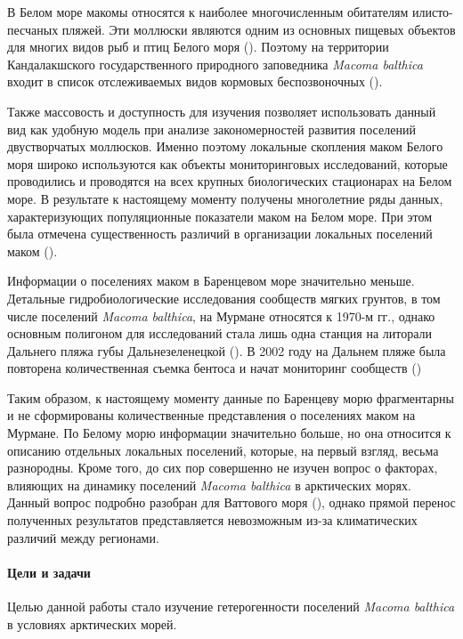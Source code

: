 В Белом море макомы относятся к наиболее многочисленным обитателям илисто-песчаных пляжей. 
Эти моллюски являются одним из основных пищевых объектов для многих видов рыб и птиц Белого моря (\cite{Azarov_1963, Percov_1963, Golcev_et_al_1997, Bianki_et_al_2003}). 
Поэтому на территории Кандалакшского государственного природного заповедника {\it Macoma balthica} входит в список отслеживаемых видов кормовых беспозвоночных (\cite{Nazarova_2003}).

Также массовость и доступность для изучения позволяет использовать данный вид как удобную модель при анализе закономерностей развития поселений двустворчатых моллюсков. 
Именно поэтому локальные скопления маком Белого моря широко используются как объекты мониторинговых исследований, которые проводились и проводятся на всех крупных биологических стационарах на Белом море. 
В результате к настоящему моменту получены многолетние ряды данных, характеризующих  популяционные показатели маком на Белом море. 
При этом была отмечена существенность различий в организации локальных поселений маком (\cite{Semenova_1974, Maximovich_Kunina_1982, Maximovich_et_al_1991, Poloskin_1996, Nikolaeva_1998, Nazarova_2003, Nazarova_Poloskin_2005}).
 
Информации о поселениях маком в Баренцевом море значительно меньше. 
Детальные гидробиологические исследования сообществ мягких грунтов, в том числе  поселений {\it Macoma balthica}, на Мурмане относятся к 1970-м гг., однако основным полигоном для исследований стала лишь одна станция на литорали Дальнего пляжа губы Дальнезеленецкой (\cite{Agarova_et_al_1976}).
В 2002 году на Дальнем пляже была повторена количественная съемка бентоса и начат мониторинг сообществ (\cite{Genelt_Dalnezeleneckaya_2008})

Таким образом, к настоящему моменту данные по Баренцеву морю фрагментарны и не сформированы количественные представления о поселениях маком на Мурмане. 
По Белому морю информации значительно больше, но она относится к описанию отдельных локальных поселений, которые, на первый взгляд, весьма разнородны. 
Кроме того, до сих пор совершенно не изучен вопрос о факторах, влияющих на динамику поселений {\it Macoma balthica} в арктических морях. 
Данный вопрос подробно разобран для Ваттового моря (\cite{Hiddink_et_al_2002_predation_epifauna, Hiddink_et_al_2002_predation_infauna, Beukema_et_al_2009}), однако прямой перенос полученных результатов представляется невозможным из-за климатических различий между регионами.


\paragraph{Цели и задачи}
Целью данной работы стало изучение гетерогенности поселений {\it Macoma balthica} в условиях арктических морей.

